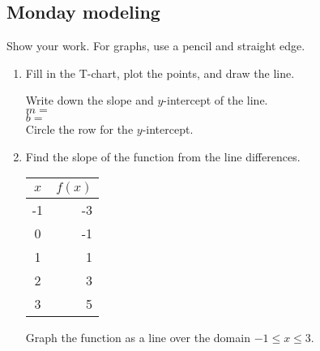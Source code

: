 \documentclass[12pt, oneside]{article}
\begin{document}
\subsection*{Monday modeling}
Show your work. For graphs, use a pencil and straight edge.
  \begin{enumerate}

\subsubsection*{Graphing linear functions}
\item Fill in the T-chart, plot the points, and draw the line.

    \begin{center} %
    \end{center}
Write down the slope and $y$-intercept of the line.\\[0.5cm]
$m=$\\[0.5cm]
$b=$\\[0.5cm]
Circle the row for the $y$-intercept.
\newpage

\item Find the slope of the function from the line differences.
    \begin{center}
      \begin{tabular}{|c|r|}
      \hline
      $x$ & $f(x)$\\
      \hline
      -1 & -3 \\
      \hline
      0 & -1 \\
      \hline
      1 & 1 \\
      \hline
      2 & 3 \\
      \hline
      3 & 5 \\
      \hline
      \end{tabular}
    \end{center}
Graph the function as a line over the domain $-1 \leq x \leq 3$.

\begin{center} %
\end{center}



\end{enumerate}
\end{document}
